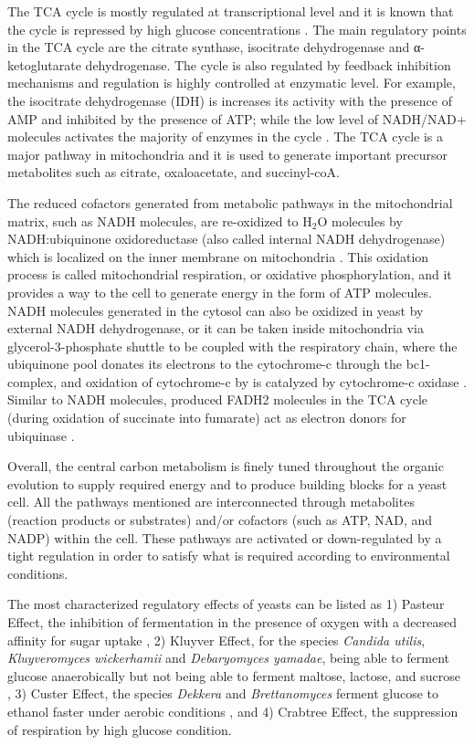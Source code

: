 The TCA cycle is mostly regulated at transcriptional level and it is known that the cycle is repressed by high glucose concentrations \cite{liu1999transcriptional}. The main regulatory points in the TCA cycle are the citrate synthase, isocitrate dehydrogenase and α-ketoglutarate dehydrogenase. The cycle is also regulated by feedback inhibition mechanisms and regulation is highly controlled at enzymatic level. For example, the isocitrate dehydrogenase (IDH) is increases its activity with the presence of AMP and inhibited by the presence of ATP\cite{coleman1975regulation}; while the low level of NADH/NAD+ molecules activates the majority of enzymes in the cycle \cite{gadde1997mutations}. The TCA cycle is a major pathway in mitochondria and it is used to generate important precursor metabolites such as citrate, oxaloacetate, and succinyl-coA.

The reduced cofactors generated from metabolic pathways in the mitochondrial matrix, such as NADH molecules, are re-oxidized to H$_2$O molecules by NADH:ubiquinone oxidoreductase (also called internal NADH dehydrogenase) which is localized on the inner membrane on mitochondria \cite{bakker2001stoichiometry}. This oxidation process is called mitochondrial respiration, or oxidative phosphorylation, and it provides a way to the cell to generate energy in the form of ATP molecules. NADH molecules generated in the cytosol can also be oxidized in yeast by external NADH dehydrogenase, or it can be taken inside mitochondria via glycerol-3-phosphate shuttle to be coupled with the respiratory chain, where the ubiquinone pool donates \cite{zitomer1979transcriptional} its electrons to the cytochrome-c through the bc1-complex, and oxidation of cytochrome-c by is catalyzed by cytochrome-c oxidase \cite{de1987mitochondrial}. Similar to NADH molecules, produced FADH2 molecules in the TCA cycle (during oxidation of succinate into fumarate) act as electron donors for ubiquinase \cite{cimini2009global}.

Overall, the central carbon metabolism is finely tuned throughout the organic evolution to supply required energy and to produce building blocks for a yeast cell. All the pathways mentioned are interconnected through metabolites (reaction products or substrates) and/or cofactors (such as ATP, NAD, and NADP) within the cell. These pathways are activated or down-regulated by a tight regulation in order to satisfy what is required according to environmental conditions.

The most characterized regulatory effects of yeasts can be listed as 1) Pasteur Effect, the inhibition of fermentation in the presence of oxygen with a decreased affinity for sugar uptake \cite{lagunas1983role}, 2) Kluyver Effect, for the species \emph{Candida utilis}, \emph{Kluyveromyces wickerhamii} and \emph{Debaryomyces yamadae}, being able to ferment glucose anaerobically but not being able to ferment maltose, lactose, and sucrose \cite{kaliterna1995transient}, 3) Custer Effect, the species \emph{Dekkera} and \emph{Brettanomyces} ferment glucose to ethanol faster under aerobic conditions \cite{scheffers1966stimulation}, and 4) Crabtree Effect, the suppression of respiration by high glucose condition.



